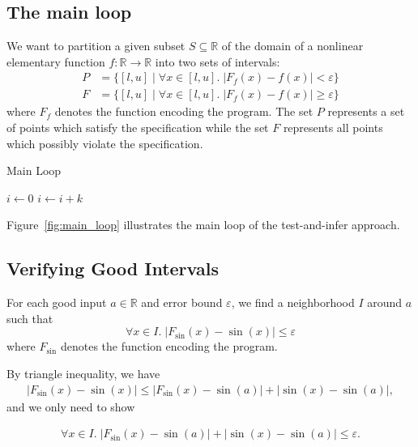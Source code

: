 \subsection{The main loop}
We want to partition a given subset $S \subseteq \mathbb{R}$ of the
domain of a nonlinear elementary function $f : \mathbb{R} \to
\mathbb{R}$ into two sets of intervals:
\begin{align*}
  P & = \{ [l, u] \mid \forall x \in [l, u]. \; | F_f(x) - f(x) | < \varepsilon \}\\
  F & = \{ [l, u] \mid \forall x \in [l, u]. \; | F_f(x) - f(x) | \ge \varepsilon \}
\end{align*}
where $F_f$ denotes the function encoding the program. The set $P$
represents a set of points which satisfy the specification while the
set $F$ represents all points which possibly violate the
specification.

\begin{algorithm}
  \centering
  \caption{Main Loop}
  \label{fig:main_loop}
  \begin{algorithmic}[1]
    \State $i\gets 0$
    \Else
    \State $i\gets i+k$
    \EndIf
    \EndIf
    \EndProcedure
  \end{algorithmic}
\end{algorithm}

Figure~\ref{fig:main_loop} illustrates the main loop of the
test-and-infer approach.


\subsection{Verifying Good Intervals}
For each good input $a\in \mathbb{R}$ and error bound $\varepsilon$,
we find a neighborhood $I$ around $a$ such that
$$\forall x\in I.\; |F_{\sin}(x)-\sin(x)|\leq \varepsilon$$
where $F_{\sin}$ denotes the function encoding the program.

By triangle inequality, we have
\begin{eqnarray}
|F_{\sin}(x) - \sin(x)| \leq |F_{\sin}(x) - \sin(a)| + |\sin(x) - \sin(a)|,
\end{eqnarray}
and we only need to show

\begin{eqnarray}
\forall x\in I.\; |F_{\sin}(x) - \sin(a)| + |\sin(x) - \sin(a)| \leq \varepsilon.
\end{eqnarray}

